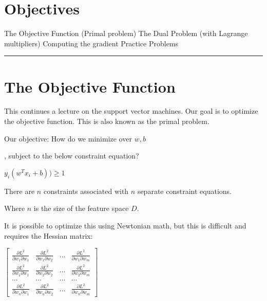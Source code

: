 
\section*{Objectives}
\begin{outline}
    \1 The Objective Function (Primal problem)
    \1 The Dual Problem (with Lagrange multipliers)
    \1 Computing the gradient
    \1 Practice Problems
\end{outline}

\rule[0.0051in]{\textwidth}{0.00025in}


\section{The Objective Function}
This continues a lecture on the support vector machines. Our goal is to optimize the objective function. This is also known as the primal problem. 

Our objective: How do we minimize over \(w, b\)

, subject to the below constraint equation? 

    \(y_i (w^Tx_i + b)) \geq 1\)


There are \(n\) constraints associated with \(n\) separate constraint equations. 

Where \(n\) is the size of the feature space \(D\).

It is possible to optimize this using Newtonian math, but this is difficult and requires the Hessian matrix:

$\left[\begin{array}{cccc}
\frac{\partial L^2}{\partial w_1 \partial w_1} & \frac{\partial L^2}{\partial w_1 \partial w_2} & ... & \frac{\partial L^2}{\partial w_1 \partial w_m}	\\
\frac{\partial L^2}{\partial w_1 \partial w_1} & \frac{\partial L^2}{\partial w_2 \partial w_2} & ... & \frac{\partial L^2}{\partial w_2 \partial w_m}	\\
... & ... & ... & ...	\\
\frac{\partial L^2}{\partial w_n \partial w_1} & \frac{\partial L^2}{\partial w_n \partial w_2} & ... & \frac{\partial L^2}{\partial w_n \partial w_m}	
\end{array}\right]$



